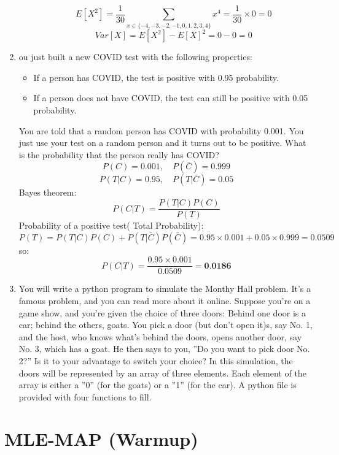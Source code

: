 \documentclass[a3paper,12pt]{extarticle} %
\begin{document}
\begin{enumerate}
\begin{enumerate}
\[        \]
        \[
            E[X^2] = \frac{1}{30} \sum_{x \in \{-4, -3, -2, -1, 0, 1, 2, 3, 4\}} x^4 = \frac{1}{30} \times 0 = 0
        \]
        \[
            Var[X] = E[X^2] - E[X]^2 = 0 - 0 = 0
        \]
    \end{enumerate}
    \item ou just built a new COVID test with the following properties:
    \begin{itemize}
        \item If a person has COVID, the test is positive with  0.95 probability.
        \item If a person does not have COVID, the test can still be positive with 0.05 probability.
    \end{itemize}
    You are told that a random person has COVID with probability 0.001. You just use your test on a random person and it turns out to be positive. What is the probability that the person really has COVID?
    \[
        P(C) = 0.001, \quad P(\bar{C}) = 0.999
    \]
    \[
        P(T | C) = 0.95, \quad P(T | \bar{C}) = 0.05
    \]
    Bayes theorem:
    \[
        P(C | T) = \frac{P(T | C)P(C)}{P(T)}
    \]
    Probability of a positive test( Total Probability):
    \[
        P(T) = P(T | C)P(C) + P(T | \bar{C})P(\bar{C}) = 0.95 \times 0.001 + 0.05 \times 0.999 = 0.0509
    \]
    so:
    \[
        P(C | T) = \frac{0.95 \times 0.001}{0.0509} = \textbf{0.0186}
    \]
    \item You will write a python program to simulate the Monthy Hall problem. It’s a famous problem, and you can read more about it online. Suppose you’re on a game show, and you’re given the choice of three doors: Behind one door is a car; behind the others, goats. You pick a door (but don’t open it)s, say No. 1, and the host, who knows what’s behind the doors, opens another door, say No. 3, which has a goat. He then says to you, ”Do
    you want to pick door No. 2?” Is it to your advantage to switch your choice? In this simulation, the doors will be represented by an array of three elements. Each element of the
    array is either a ”0” (for the goats) or a ”1” (for the car). A python file is provided with four functions to fill.
\end{enumerate}

\newpage
\section{MLE-MAP (Warmup)}

\newpage
\end{document}

